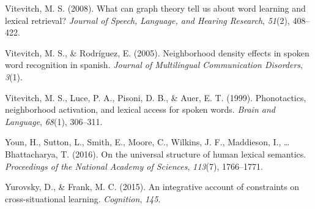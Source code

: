 \documentclass[english,floatsintext,man]{apa6}
\theoremstyle{definition}
\theoremstyle{definition}
\theoremstyle{definition}
\theoremstyle{remark}
\begin{document}
\hypertarget{ref-vitevitch2008}{}
Vitevitch, M. S. (2008). What can graph theory tell us about word
learning and lexical retrieval? \emph{Journal of Speech, Language, and
Hearing Research}, \emph{51}(2), 408--422.

\hypertarget{ref-vitevitch2005}{}
Vitevitch, M. S., \& Rodríguez, E. (2005). Neighborhood density effects
in spoken word recognition in spanish. \emph{Journal of Multilingual
Communication Disorders}, \emph{3}(1).

\hypertarget{ref-vitevitch1999}{}
Vitevitch, M. S., Luce, P. A., Pisoni, D. B., \& Auer, E. T. (1999).
Phonotactics, neighborhood activation, and lexical access for spoken
words. \emph{Brain and Language}, \emph{68}(1), 306--311.

\hypertarget{ref-youn2016}{}
Youn, H., Sutton, L., Smith, E., Moore, C., Wilkins, J. F., Maddieson,
I., \ldots{} Bhattacharya, T. (2016). On the universal structure of
human lexical semantics. \emph{Proceedings of the National Academy of
Sciences}, \emph{113}(7), 1766--1771.

\hypertarget{ref-yurovsky2015}{}
Yurovsky, D., \& Frank, M. C. (2015). An integrative account of
constraints on cross-situational learning. \emph{Cognition}, \emph{145}.
\end{document}
